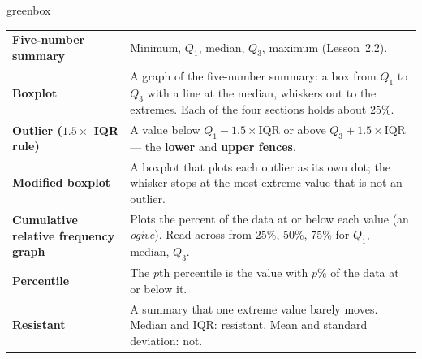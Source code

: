 \documentclass[10pt]{article}
\begin{document}
\boxguard[24]
\begin{skillbox}{greenbox}
\small
\renewcommand{\arraystretch}{1.35}
\begin{tabularx}{\linewidth}{@{} >{\bfseries}p{3.4cm} X @{}}
Five-number summary & Minimum, $Q_1$, median, $Q_3$, maximum (Lesson~2.2). \\
Boxplot & A graph of the five-number summary: a box from $Q_1$ to $Q_3$ with a line at the
       median, whiskers out to the extremes. Each of the four sections holds about $25\%$. \\
Outlier ($1.5 \times$ IQR rule) & A value below $Q_1 - 1.5 \times \text{IQR}$ or above
       $Q_3 + 1.5 \times \text{IQR}$ --- the \textbf{lower} and \textbf{upper fences}. \\
Modified boxplot & A boxplot that plots each outlier as its own dot; the whisker stops at the
       most extreme value that is not an outlier. \\
Cumulative relative frequency graph & Plots the percent of the data at or below each value
       (an \emph{ogive}). Read across from $25\%$, $50\%$, $75\%$ for $Q_1$, median, $Q_3$. \\
Percentile & The $p$th percentile is the value with $p\%$ of the data at or below it. \\
Resistant & A summary that one extreme value barely moves. Median and IQR: resistant. Mean and
       standard deviation: not. \\
\end{tabularx}
\end{skillbox}
\end{document}
